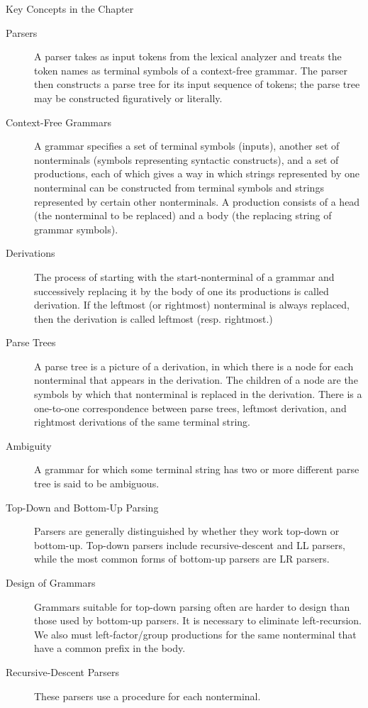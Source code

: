 \begin{bibunit}[apalike]
\begin{frame}[t,allowframebreaks]{Key Concepts in the Chapter}
	\begin{small}
	\begin{description}
	\item[Parsers] A parser takes as input tokens from the lexical analyzer and treats the token names as terminal symbols of a context-free grammar. The parser then constructs a parse tree for its input sequence of tokens; the parse tree may be constructed figuratively or literally.
	\item[Context-Free Grammars] A grammar specifies a set of terminal symbols (inputs), another set of nonterminals (symbols representing syntactic constructs), and a set of productions, each of which gives a way in which strings represented by one nonterminal can be constructed from terminal symbols and strings represented by certain other nonterminals. A production consists of a head (the nonterminal to be replaced) and a body (the replacing string of grammar symbols).
	\item[Derivations] The process of starting with the start-nonterminal of a grammar and successively replacing it by the body of one its productions is called derivation. If the leftmost (or rightmost) nonterminal is always replaced, then the derivation is called leftmost (resp. rightmost.)
	\item[Parse Trees] A parse tree is a picture of a derivation, in which there is a node for each nonterminal that appears in the derivation. The children of a node are the symbols by which that nonterminal is replaced in the derivation. There is a one-to-one correspondence between parse trees, leftmost derivation, and rightmost derivations of the same terminal string.
	\item[Ambiguity] A grammar for which some terminal string has two or more different parse tree is said to be ambiguous.
	\item[Top-Down and Bottom-Up Parsing] Parsers are generally distinguished by whether they work top-down or bottom-up. Top-down parsers include recursive-descent and LL parsers, while the most common forms of bottom-up parsers are LR parsers.
	\item[Design of Grammars] Grammars suitable for top-down parsing often are harder to design than those used by bottom-up parsers. It is necessary to eliminate left-recursion. We also must left-factor/group productions for the same nonterminal that have a common prefix in the body.
	\item[Recursive-Descent Parsers] These parsers use a procedure for each nonterminal.

\end{description}
\end{small}
\end{frame}
\end{bibunit}

